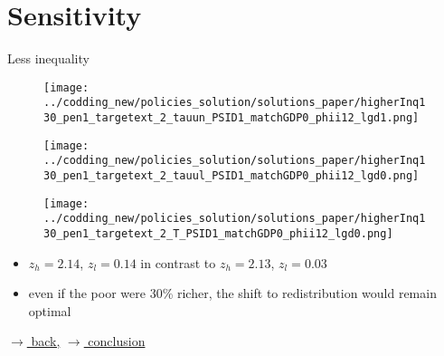 \documentclass[11pt,aspectratio=169]{beamer}
\begin{document}
	\section{Sensitivity}
	\begin{frame}{Less inequality}
		\hypertarget{sensi}{}
		\begin{figure}
			\begin{minipage}[]{0.32\textwidth}
				\texttt{[image: ../codding\_new/policies\_solution/solutions\_paper/higherInq130\_pen1\_targetext\_2\_tauun\_PSID1\_matchGDP0\_phii12\_lgd1.png]}
			\end{minipage}
			\begin{minipage}[]{0.32\textwidth}
				\texttt{[image: ../codding\_new/policies\_solution/solutions\_paper/higherInq130\_pen1\_targetext\_2\_tauul\_PSID1\_matchGDP0\_phii12\_lgd0.png]}
			\end{minipage}
			\begin{minipage}[]{0.32\textwidth}
				\texttt{[image: ../codding\_new/policies\_solution/solutions\_paper/higherInq130\_pen1\_targetext\_2\_T\_PSID1\_matchGDP0\_phii12\_lgd0.png]}
			\end{minipage} 
		\end{figure}
		\begin{itemize}
			\item $z_h=2.14$, $z_l=0.14$ in contrast to $z_h=2.13$, $z_l=0.03$
			\item  even if the poor were 30\% richer, the shift to redistribution would remain optimal
		\end{itemize}
		\vspace{-1mm}
		\hfill 
		\hyperlink{backpe}{\tiny{$\rightarrow$ back,}}
		\hyperlink{conc}{\tiny{$\rightarrow$ conclusion}}	
	\end{frame}
	
\end{document}
